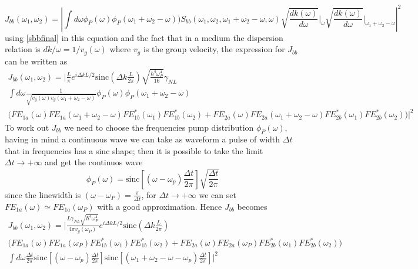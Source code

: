 \begin{equation}J_{bb}(\omega_1,\omega_2) = \left|\int d\omega \phi_P(\omega)\phi_P(\omega_1 + \omega_2 - \omega))S_{bb}(\omega_1,\omega_2,\omega_1+\omega_2-\omega,\omega)\sqrt{ \frac{dk(\omega)}{d\omega}}\Bigg|_{\omega}\sqrt{\frac{dk(\omega)}{d\omega}}\Bigg|_{\omega_1+\omega_2-\omega} \right|^2\end{equation}
using \eqref{sbbfinal} in this equation and the fact that in a medium the dispersion relation is $dk/\omega = 1/v_g(\omega)$ where $v_g$ is the group velocity, the expression for $J_{bb}$ can be written as
\begin{multline}J_{bb}(\omega_1,\omega_2) = \Bigg|\frac{L}{\pi}e^{i\Delta k L/2} \text{sinc}\left(\Delta k \frac{L}{2\pi}\right) \sqrt{\frac{\hbar^4\omega_P^4}{16}}\gamma_{NL} \\ \int d\omega \frac{1}{\sqrt{v_g(\omega)v_g(\omega_1+\omega_2 - \omega)}}\phi_P(\omega)\phi_P(\omega_1 + \omega_2 - \omega)\\ \Big( FE_{1a}(\omega)FE_{1a}(\omega_1+\omega_2-\omega)FE^*_{1b}(\omega_1)FE^*_{1b}(\omega_2) + FE_{2a}(\omega)FE_{2a}(\omega_1 + \omega_2-\omega)FE^*_{2b}(\omega_1)FE^*_{2b}(\omega_2)\Big)\Bigg|^2 \end{multline}
To work out $J_{bb}$ we need to choose the frequencies pump distribution $\phi_{P}(\omega)$, having in mind a continuous wave we can take as waveform a pulse of width $\Delta t$ that in frequencies has a sinc shape; then it is possible to take the limit $\Delta t \to +\infty$ and get the continuos wave
\begin{equation}\phi_P(\omega) = \text{sinc}\left[(\omega-\omega_p) \frac{\Delta t}{2\pi} \right]\sqrt{\frac{\Delta t}{2\pi}}\end{equation}
since the linewidth is $(\omega - \omega_P)= \frac{\pi}{\Delta t}$, for $\Delta t \to +\infty$ we can set $FE_{1a}(\omega) \simeq FE_{1a}(\omega_P)$ with a good approximation. Hence $J_{bb}$ becomes
\begin{multline}J_{bb}(\omega_1,\omega_2) = \Bigg|\frac{L\gamma_{NL}\sqrt{\hbar^4\omega_P^4}}{4\pi v_g(\omega_P)}e^{i\Delta k L/2} \text{sinc}\left(\Delta k \frac{L}{2\pi}\right)\\ \Big( FE_{1a}(\omega)FE_{1a}(\omega_P)FE^*_{1b}(\omega_1)FE^*_{1b}(\omega_2) + FE_{2a}(\omega)FE_{2a}(\omega_P)FE^*_{2b}(\omega_1)FE^*_{2b}(\omega_2)\Big) \\ \int d\omega  \frac{\Delta t}{2\pi}\text{sinc}\left[(\omega-\omega_p) \frac{\Delta t}{2\pi} \right]\text{sinc}\left[(\omega_1+\omega_2-\omega-\omega_p) \frac{\Delta t}{2\pi} \right]\Bigg|^2\end{multline}
